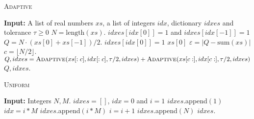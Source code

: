 \begin{algorithm}[t]
    \caption{\textsc{Adaptive}}\label{alg:adaptive-quadrature}
    \begin{algorithmic}
    \State \textbf{Input:} A list of real numbers $xs$, a list of integers $idx$, dictionary $idxes$ and tolerance $\tau \geq 0$
    \State $N = \text{length}(xs)$.
        \State $idxes[idx[0]] = 1$ and $idxes[idx[-1]] = 1$
        \State $Q = N \cdot (xs[0] + xs[-1]) / 2$.
    \Else
        \State $idxes[idx[0]] =1$
        \State \Return $xs[0]$
    \EndIf
    \State $\varepsilon = |Q - \text{sum}(xs)|$
    \If{$\varepsilon \geq \tau$}
        \State $c = \lfloor N / 2 \rfloor$.
        \State $Q, idxes = \textsc{Adaptive}(xs[:c], idx[:c], \tau /2, idxes) + \textsc{Adaptive}(xs[c:], idx[c:], \tau /2, idxes)$
    \EndIf
    \State \Return $Q, idxes$.
    \end{algorithmic}
    \end{algorithm}


    \begin{algorithm}[t]
        \caption{\textsc{Uniform}}\label{alg:uniform}
        \begin{algorithmic}
        \State \textbf{Input:} Integers $N,M$.
        \State $idxes = []$, $idx = 0$ and $i=1$
        \State $idxes$.append$(1)$
        \State $idx = i * M$
        \State $idxes.$append$(i * M)$
        \State $i = i + 1$
        \EndWhile
        \State $idxes$.append$(N)$
        \State \Return $idxes$.
        \end{algorithmic}
        \end{algorithm}



